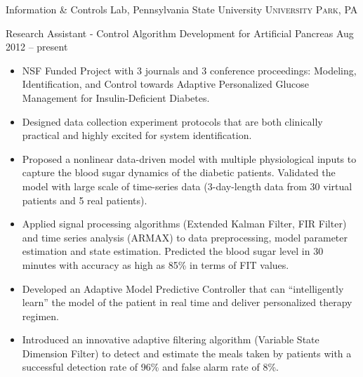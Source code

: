 \documentclass[10pt,a4paper]{article}
\begin{document}




\spacedhrule{0.5em}{-0.8em}


\headedsection
{Information \& Controls Lab, Pennsylvania State University}
{\textsc{University Park, PA}}
  {
    \headedsubsection
    {Research Assistant - Control Algorithm Development for Artificial Pancreas}
    {Aug 2012 -- present}
    {
      \begin{itemize}
      \item NSF Funded Project with 3 journals and 3 conference proceedings:
        Modeling, Identification, and Control towards Adaptive Personalized Glucose
        Management for Insulin-Deficient Diabetes.
        
      \item Designed data collection experiment protocols that are both
        clinically practical and highly excited for system identification.

      \item Proposed a nonlinear data-driven model with multiple physiological
        inputs to capture the blood sugar dynamics of the diabetic patients.
        Validated the model with large scale of time-series data (3-day-length
        data from 30 virtual patients and 5 real patients). 
        
      \item Applied signal processing algorithms (Extended Kalman Filter, FIR
        Filter) and time series analysis (ARMAX) to data preprocessing, model
        parameter estimation and state estimation. Predicted the blood sugar level in 30
        minutes with accuracy as high as 85\% in terms of FIT values.

      \item Developed an Adaptive Model Predictive Controller that can
        ``intelligently learn'' the model of the patient in real time and deliver
        personalized therapy regimen.
        
      \item Introduced an innovative adaptive filtering algorithm (Variable
        State Dimension Filter) to detect and estimate the meals taken by
        patients with a successful detection rate of 96\% and false alarm rate
        of 8\%.
      \end{itemize}
    }
  }
\end{document}
